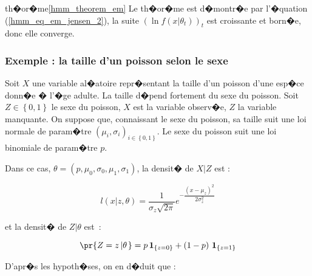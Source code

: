         
\begin{xdemo}{th�or�me}{\ref{hmm_theorem_em}}
Le th�or�me est d�montr�e par l'�quation (\ref{hmm_eq_em_jensen_2}), la suite $\left(  \ln f\left(  x\left| \theta_{t}\right. \right)\right)  _{t}$ est croissante et born�e, donc elle converge.
\end{xdemo}
        
        
        
        
        



\subsubsection{Exemple : la taille d'un poisson selon le sexe}


Soit $X$ une variable al�atoire repr�sentant la taille d'un poisson d'une esp�ce donn�e � l'�ge adulte. La taille d�pend fortement du sexe du poisson. Soit $Z\in\left\{  0,1\right\}  $ le sexe du poisson, $X$ est la variable observ�e, $Z$ la variable manquante. On suppose que, connaissant le sexe du poisson, sa taille suit une loi normale de param�tre $\left(  \mu_{i},\sigma_{i}\right)  _{i\in\left\{ 0,1\right\} }$. Le sexe du poisson suit une loi binomiale de param�tre $p$.

Dans ce cas, $\theta=\left(  p,\mu_{0},\sigma_{0},\mu_{1},\sigma_{1}\right)$, la densit� de $X|Z$ est :%

        $$
        l\left(  x\left|  z,\theta\right.  \right)   = \dfrac{1}{\sigma_z\sqrt{2\pi} }
        e^{-\dfrac{\left(  x-\mu_{z}\right)  ^{2}}{2\sigma_{z}^{2}}}
        $$
        
et la densit� de $Z|\theta$ est~:

        $$
        \pr{Z=z\left|  \theta\right.  }   = p\,\mathbf{1}_{\left\{z=0\right\}  }+\left(  1-p\right)
        \,\mathbf{1}_{\left\{  z=1\right\}  }
        $$

D'apr�s les hypoth�ses, on en d�duit que :%

